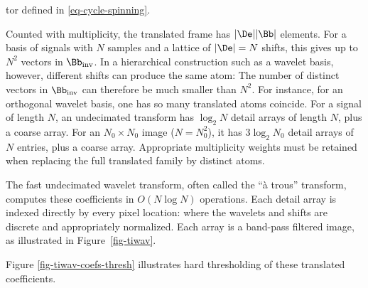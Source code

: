 tor defined in \eqref{eq-cycle-spinning}.

Counted with multiplicity, the translated frame has $|\De| |\Bb|$ elements.
For a basis of signals with $N$ samples and a lattice of $|\De|=N$ shifts, this gives up to $N^2$ vectors in $\Bb_{\text{inv}}$. In a hierarchical construction such as a wavelet basis, however, different shifts can produce the same atom:
The number of distinct vectors in $\Bb_{\text{inv}}$ can therefore be much smaller than $N^2$.
For instance, for an orthogonal wavelet basis, one has
so many translated atoms coincide. For a signal of length $N$, an undecimated transform has $\log_2N$ detail arrays of length $N$, plus a coarse array. For an $N_0\times N_0$ image ($N=N_0^2$), it has $3\log_2N_0$ detail arrays of $N$ entries, plus a coarse array. Appropriate multiplicity weights must be retained when replacing the full translated family by distinct atoms.

The fast undecimated wavelet transform, often called the ``\`a trous'' transform, computes these coefficients in $O(N\log N)$ operations. Each detail array is indexed directly by every pixel location:
where the wavelets and shifts are discrete and appropriately normalized. Each array is a band-pass filtered image, as illustrated in Figure~\ref{fig-tiwav}.


Figure \ref{fig-tiwav-coefs-thresh} illustrates hard thresholding of these translated coefficients.




